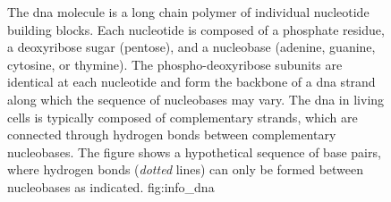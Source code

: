 \begin{figure}[!htb]
{%
}

{
The \gls{dna} molecule is a long chain polymer of individual nucleotide building blocks.
Each nucleotide is composed of a phosphate residue, a deoxyribose sugar (pentose), and a nucleobase (adenine, guanine, cytosine, or thymine).
The phospho-deoxyribose subunits are identical at each nucleotide and form the backbone of a \gls{dna} strand along which the sequence of nucleobases may vary.
The \gls{dna} in living cells is typically composed of  complementary strands, which are connected through hydrogen bonds between complementary nucleobases.
The figure shows a hypothetical sequence of  base pairs, where hydrogen bonds (\emph{dotted} lines) can only be formed between nucleobases as indicated.}
{fig:info_dna}
\end{figure}
